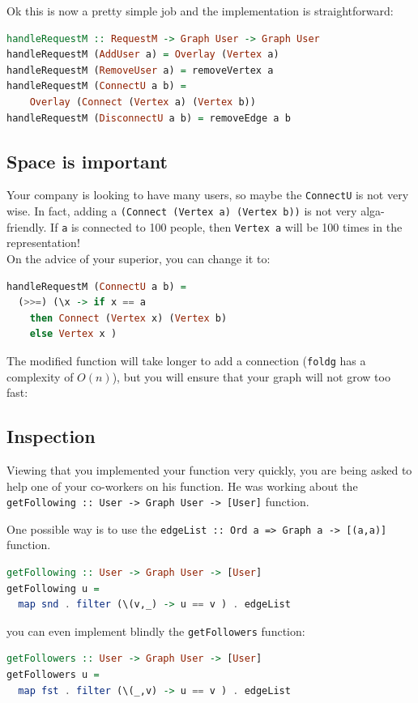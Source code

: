 \documentclass[10pt,a4paper]{article}
\begin{document}
Ok this is now a pretty simple job and the implementation is straightforward: 
\begin{lstlisting}[language=Haskell, frame=single]
handleRequestM :: RequestM -> Graph User -> Graph User
handleRequestM (AddUser a) = Overlay (Vertex a)
handleRequestM (RemoveUser a) = removeVertex a
handleRequestM (ConnectU a b) = 
	Overlay (Connect (Vertex a) (Vertex b))
handleRequestM (DisconnectU a b) = removeEdge a b
\end{lstlisting}

\subsection{Space is important}
Your company is looking to have many users, so maybe the \verb|ConnectU| is not very wise. In fact, adding a \verb|(Connect (Vertex a) (Vertex b))| is not very alga-friendly. If \verb|a| is connected to 100 people, then \verb|Vertex a| will be 100 times in the representation!
\\
On the advice of your superior, you can change it to:
\begin{lstlisting}[language=Haskell, frame=single]
handleRequestM (ConnectU a b) = 
  (>>=) (\x -> if x == a 
    then Connect (Vertex x) (Vertex b)
    else Vertex x )
\end{lstlisting}
The modified function will take longer to add a connection (\verb|foldg| has a complexity of $O(n)$), but you will ensure that your graph will not grow too fast:

\subsection{Inspection}
Viewing that you implemented your function very quickly, you are being asked to help one of your co-workers on his function. He was working about the \verb|getFollowing :: User -> Graph User -> [User]| function.

One possible way is to use the \verb|edgeList :: Ord a => Graph a -> [(a,a)]| function.

\begin{lstlisting}[language=Haskell, frame=single]
getFollowing :: User -> Graph User -> [User]
getFollowing u =
  map snd . filter (\(v,_) -> u == v ) . edgeList
\end{lstlisting}

you can even implement blindly the \verb|getFollowers| function:
\begin{lstlisting}[language=Haskell, frame=single]
getFollowers :: User -> Graph User -> [User]
getFollowers u =
  map fst . filter (\(_,v) -> u == v ) . edgeList
\end{lstlisting}
\end{document}
